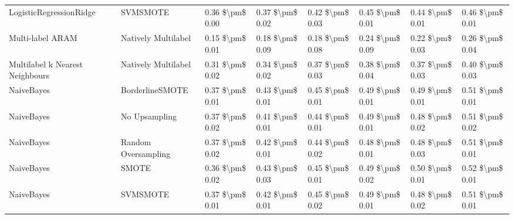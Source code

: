 \begin{tabular}{llllllll}
        LogisticRegressionRidge &                      SVMSMOTE & 0.36 \$\textbackslash pm\$ 0.00 &           0.37 \$\textbackslash pm\$ 0.02 &       0.42 \$\textbackslash pm\$ 0.03 &        0.45 \$\textbackslash pm\$ 0.01 &                         0.44 \$\textbackslash pm\$ 0.01 &     0.46 \$\textbackslash pm\$ 0.01 \\
               Multi-label ARAM &           Natively Multilabel & 0.15 \$\textbackslash pm\$ 0.01 &           0.18 \$\textbackslash pm\$ 0.09 &       0.18 \$\textbackslash pm\$ 0.08 &        0.24 \$\textbackslash pm\$ 0.09 &                         0.22 \$\textbackslash pm\$ 0.03 &     0.26 \$\textbackslash pm\$ 0.04 \\
Multilabel k Nearest Neighbours &           Natively Multilabel & 0.31 \$\textbackslash pm\$ 0.02 &           0.34 \$\textbackslash pm\$ 0.02 &       0.37 \$\textbackslash pm\$ 0.03 &        0.38 \$\textbackslash pm\$ 0.04 &                         0.37 \$\textbackslash pm\$ 0.03 &     0.40 \$\textbackslash pm\$ 0.03 \\
                     NaiveBayes &               BorderlineSMOTE & 0.37 \$\textbackslash pm\$ 0.01 &           0.43 \$\textbackslash pm\$ 0.01 &       0.45 \$\textbackslash pm\$ 0.01 &        0.49 \$\textbackslash pm\$ 0.01 &                         0.49 \$\textbackslash pm\$ 0.01 &     0.51 \$\textbackslash pm\$ 0.01 \\
                     NaiveBayes &                 No Upsampling & 0.37 \$\textbackslash pm\$ 0.02 &           0.41 \$\textbackslash pm\$ 0.01 &       0.44 \$\textbackslash pm\$ 0.01 &        0.49 \$\textbackslash pm\$ 0.01 &                         0.48 \$\textbackslash pm\$ 0.02 &     0.51 \$\textbackslash pm\$ 0.02 \\
                     NaiveBayes &           Random Oversampling & 0.37 \$\textbackslash pm\$ 0.02 &           0.42 \$\textbackslash pm\$ 0.01 &       0.44 \$\textbackslash pm\$ 0.02 &        0.48 \$\textbackslash pm\$ 0.01 &                         0.48 \$\textbackslash pm\$ 0.03 &     0.51 \$\textbackslash pm\$ 0.01 \\
                     NaiveBayes &                         SMOTE & 0.36 \$\textbackslash pm\$ 0.02 &           0.43 \$\textbackslash pm\$ 0.03 &       0.45 \$\textbackslash pm\$ 0.01 &        0.49 \$\textbackslash pm\$ 0.02 &                         0.50 \$\textbackslash pm\$ 0.01 &     0.52 \$\textbackslash pm\$ 0.01 \\
                     NaiveBayes &                      SVMSMOTE & 0.37 \$\textbackslash pm\$ 0.01 &           0.42 \$\textbackslash pm\$ 0.01 &       0.45 \$\textbackslash pm\$ 0.02 &        0.49 \$\textbackslash pm\$ 0.01 &                         0.48 \$\textbackslash pm\$ 0.02 &     0.51 \$\textbackslash pm\$ 0.01 \\

\end{tabular}
